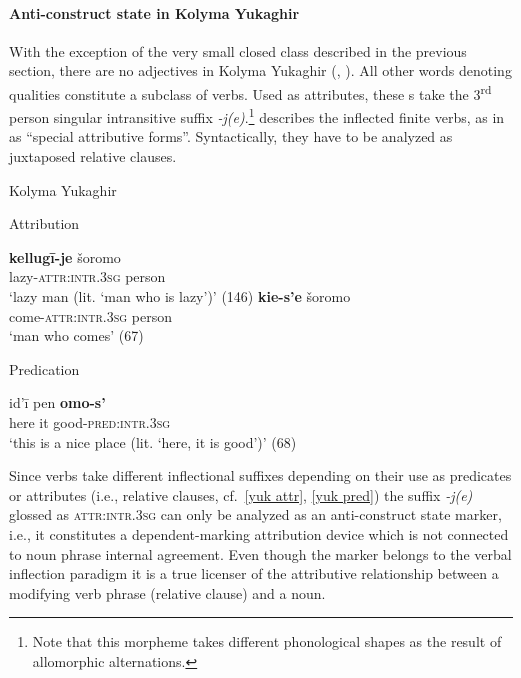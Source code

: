 \paragraph*{Anti\hyp{}construct state in Kolyma Yukaghir}
With the exception of the very small closed class described in the previous section, there are no adjectives in Kolyma Yukaghir (\citealt[79–112]{krejnovic1982}, \citealt[66–69, 145–147]{maslova2003b}). All other words denoting qualities constitute a subclass of verbs. Used as attributes, these s take the 3\textsuperscript{rd} person singular intransitive suffix \mbox{\textit{-j(e)}}.\footnote{Note that this morpheme takes different phonological shapes as the result of allomorphic alternations.} \citet[66, passim]{maslova2003b} describes the inflected finite verbs, as in  as “special attributive forms”. Syntactically, they have to be analyzed as juxtaposed relative clauses.
\begin{exe}
\ex 	
{\rm Kolyma Yukaghir \citep{maslova2003b}}
\begin{xlist}
\ex 
\label{yuk attr}
{\rm Attribution}
\begin{xlist}
\ex
\gll 	\textbf{kellugī-je} šoromo\\
	lazy-\textsc{attr:intr.3sg} person\\
\glt	‘lazy man (lit. ‘man who is lazy’)’ (146)
\ex
\gll	\textbf{kie-s'e} šoromo\\
	come-\textsc{attr:intr.3sg} person\\
\glt	‘man who comes’ (67)
\end{xlist}

\ex 
\label{yuk pred} 
{\rm Predication}
\begin{xlist}
\ex
\gll 	id'ī pen \textbf{omo-s'}\\
	here it good-\textsc{pred:intr.3sg}\\
\glt	‘this is a nice place (lit. ‘here, it is good’)’ (68)
\end{xlist}
\end{xlist}
\end{exe}
Since verbs take different inflectional suffixes depending on their use as predicates or attributes (i.e., relative clauses, cf.~\ref{yuk attr}, \ref{yuk pred}) the suffix \textit{-j(e)} glossed as \textsc{attr:intr.3sg} can only be analyzed as an anti\hyp{}construct state marker, i.e., it constitutes a dependent\hyp{}marking attribution device which is not connected to noun phrase internal agreement. Even though the marker belongs to the verbal inflection paradigm it is a true licenser of the attributive relationship between a modifying verb phrase (relative clause) and a noun.

